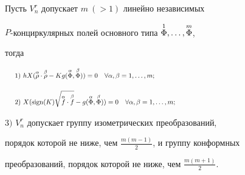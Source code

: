\begin{thm}


Пусть $V^r_n$ допускает $m\ (>1)$ линейно независимых


$P$-конциркулярных полей основного типа $\overset{1}{\Phi}{}, \dotsc,\overset{m}{\Phi}{}$,


тогда


\begin{equation}


\hspace{5mm} 1)\ hX( \os {\ro}\a \cdot\os {\ro}\be - K g(\os {\F}\a,\os


{\F}\be))=0 \quad \fl\a,\be=1,\ds, m;\hspace{82mm}


\end{equation}


\begin{equation}


\hspace{5mm} 2)\ X( \mathrm{sign}(K)


\sqrt{\os {f}\a\cdot\os {f}\be}-g(\os {\F}\a,\os


{\F}\be))=0\quad \fl\a,\be=1,\ds, m;\hspace{71mm}


\end{equation}





$3)$ $V^r_n$ допускает группу изометрических преобразований,


порядок которой не ниже, чем $\frac{m(m-1)}2$, и группу конформных


преобразований, порядок которой не ниже, чем $\frac{m(m+1)}2$.


\end{thm}





